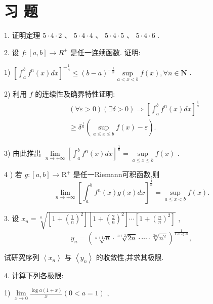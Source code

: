 \section*{习 题}

1. 证明定理 $5 \cdot  4 \cdot  2\text{ 、 }5 \cdot  4 \cdot  4\text{ 、 }5 \cdot  4 \cdot  5\text{ 、 }5 \cdot  4 \cdot  6$ .

2. 设 $f : \left\lbrack  {a,b}\right\rbrack   \rightarrow  {R}^{ + }$ 是任一连续函数. 证明:

1) ${\left\lbrack  {\int }_{a}^{b}{f}^{n}\left( x\right) dx\right\rbrack  }^{-\frac{1}{n}} \leq  {\left( b - a\right) }^{-\frac{1}{n}}\mathop{\sup }\limits_{{a < x < b}}f\left( x\right) ,\forall n \in  \mathbf{N}$ .

2) 利用 $f$ 的连续性及确界特性证明:
\begin{align*}
	&\left( {\forall \varepsilon  > 0}\right) \left( {\exists \delta  > 0}\right)  \Rightarrow  {\left\lbrack  {\int }_{a}^{b}{f}^{n}\left( x\right) dx\right\rbrack  }^{\frac{1}{n}}\\
	&\geq  {\delta }^{\frac{1}{n}}\left( {\mathop{\sup }\limits_{{a \leq  x \leq  b}}f\left( x\right)  - \varepsilon }\right) .
\end{align*}

3) 由此推出 $\mathop{\lim }\limits_{{n \rightarrow   + \infty }}{\left\lbrack  {\int }_{a}^{b}{f}^{n}\left( x\right) dx\right\rbrack  }^{\frac{1}{n}} = \mathop{\sup }\limits_{{a \leq  x \leq  b}}f\left( x\right)$ .

4 ) 若 $g : \left\lbrack  {a,b}\right\rbrack   \rightarrow  {\mathrm{R}}^{ + }$ 是任一Riemann可积函数,则
$$\mathop{\lim }\limits_{{n \rightarrow   + \infty }}{\left\lbrack  {\int }_{a}^{b}{f}^{n}\left( x\right) g\left( x\right) dx\right\rbrack  }^{\frac{1}{n}} = \mathop{\sup }\limits_{{a \leq  x < b}}f\left( x\right) .$$

3. 设 ${x}_{n} = \sqrt[n]{\left\lbrack  {1 + {\left( \frac{1}{n}\right) }^{2}}\right\rbrack  \left\lbrack  {1 + {\left( \frac{2}{n}\right) }^{2}}\right\rbrack  \cdots \left\lbrack  {1 + {\left( \frac{n}{n}\right) }^{2}}\right\rbrack  }$ ,
$${y}_{n} = {\left( \sqrt[{n + 1}]{n} \cdot  \sqrt[{n + 2}]{2n} \cdot  \cdots  \cdot  \sqrt[{2n}]{{n}^{2}}\right) }^{\frac{1}{1 \cdot  0 \cdot  g \cdot  n}},$$

试研究序列 $\left\langle  {x}_{n}\right\rangle$ 与 $\left\langle  {y}_{n}\right\rangle$ 的收敛性,并求其极限.

4. 计算下列各极限:

1) $\mathop{\lim }\limits_{{x \rightarrow  0}}\frac{\log a\left( {1 + x}\right) }{x}\left( {0 < a = 1}\right)$ ,


